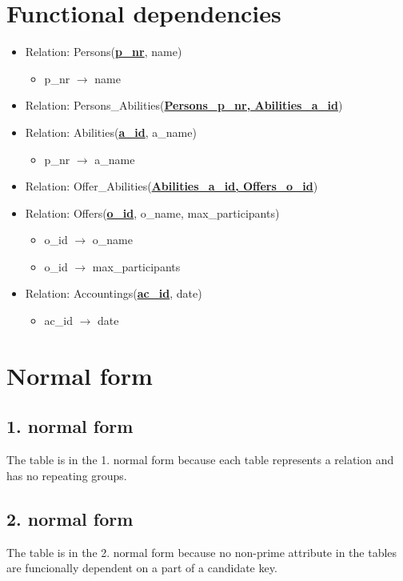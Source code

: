 \documentclass[12pt,a4paper,ngerman]{article}
\begin{document}
\section{Functional dependencies}
\begin{itemize}
	\item Relation: Persons(\textbf{\underline{p\_nr}}, name)
		\begin{itemize}
			\item p\_nr $\rightarrow$ name
		\end{itemize}
	\item Relation: Persons\_Abilities(\textbf{\underline{Persons\_p\_nr, Abilities\_a\_id}})
	\item Relation: Abilities(\textbf{\underline{a\_id}}, a\_name)
		\begin{itemize}
			\item p\_nr $\rightarrow$ a\_name
		\end{itemize}
	\item Relation: Offer\_Abilities(\textbf{\underline{Abilities\_a\_id, Offers\_o\_id}})
	\item Relation: Offers(\textbf{\underline{o\_id}}, o\_name, max\_participants)
		\begin{itemize}
			\item o\_id $\rightarrow$ o\_name
			\item o\_id $\rightarrow$ max\_participants
		\end{itemize}
	\item Relation: Accountings(\textbf{\underline{ac\_id}}, date)
		\begin{itemize}
			\item ac\_id $\rightarrow$ date
		\end{itemize}
\end{itemize}

\section{Normal form}
\subsection{1. normal form}
The table is in the 1. normal form because each table represents a relation and has no repeating groups. 

\subsection{2. normal form}
The table is in the 2. normal form because no non-prime attribute in the tables are funcionally dependent on a part of a candidate key. 
\end{document}
